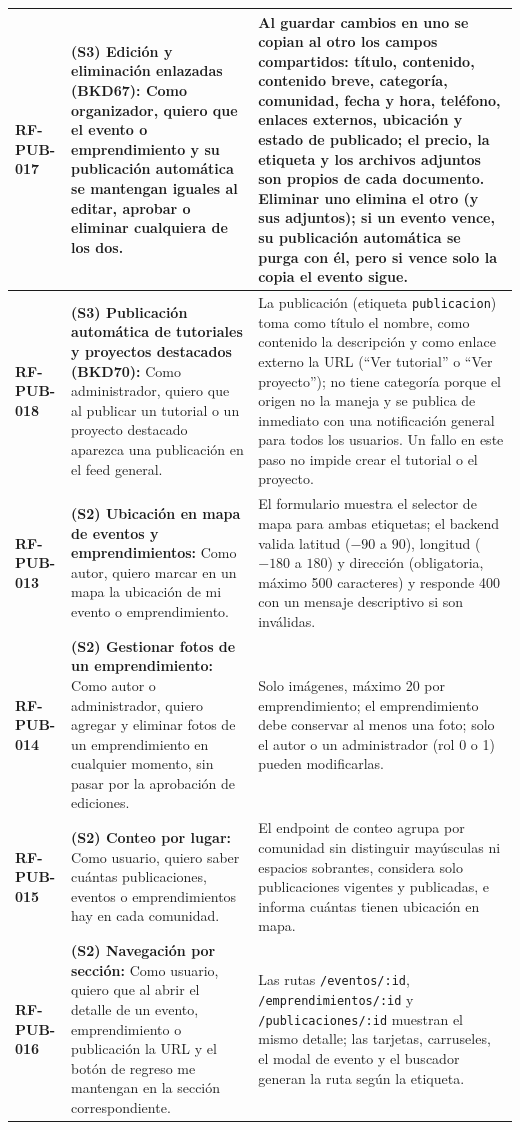\begin{longtable}{|l||p{7cm}|p{4.5cm}|}
\hline
\textbf{RF-PUB-017} & \textbf{(S3) Edición y eliminación enlazadas (BKD67):} Como organizador, quiero que el evento o emprendimiento y su publicación automática se mantengan iguales al editar, aprobar o eliminar cualquiera de los dos. & Al guardar cambios en uno se copian al otro los campos compartidos: título, contenido, contenido breve, categoría, comunidad, fecha y hora, teléfono, enlaces externos, ubicación y estado de publicado; el precio, la etiqueta y los archivos adjuntos son propios de cada documento. Eliminar uno elimina el otro (y sus adjuntos); si un evento vence, su publicación automática se purga con él, pero si vence solo la copia el evento sigue. \\
\hline
\textbf{RF-PUB-018} & \textbf{(S3) Publicación automática de tutoriales y proyectos destacados (BKD70):} Como administrador, quiero que al publicar un tutorial o un proyecto destacado aparezca una publicación en el feed general. & La publicación (etiqueta \texttt{publicacion}) toma como título el nombre, como contenido la descripción y como enlace externo la URL (``Ver tutorial'' o ``Ver proyecto''); no tiene categoría porque el origen no la maneja y se publica de inmediato con una notificación general para todos los usuarios. Un fallo en este paso no impide crear el tutorial o el proyecto. \\
\hline
\textbf{RF-PUB-013} & \textbf{(S2) Ubicación en mapa de eventos y emprendimientos:} Como autor, quiero marcar en un mapa la ubicación de mi evento o emprendimiento. & El formulario muestra el selector de mapa para ambas etiquetas; el backend valida latitud ($-90$ a $90$), longitud ($-180$ a $180$) y dirección (obligatoria, máximo 500 caracteres) y responde 400 con un mensaje descriptivo si son inválidas. \\
\hline
\textbf{RF-PUB-014} & \textbf{(S2) Gestionar fotos de un emprendimiento:} Como autor o administrador, quiero agregar y eliminar fotos de un emprendimiento en cualquier momento, sin pasar por la aprobación de ediciones. & Solo imágenes, máximo 20 por emprendimiento; el emprendimiento debe conservar al menos una foto; solo el autor o un administrador (rol 0 o 1) pueden modificarlas. \\
\hline
\textbf{RF-PUB-015} & \textbf{(S2) Conteo por lugar:} Como usuario, quiero saber cuántas publicaciones, eventos o emprendimientos hay en cada comunidad. & El endpoint de conteo agrupa por comunidad sin distinguir mayúsculas ni espacios sobrantes, considera solo publicaciones vigentes y publicadas, e informa cuántas tienen ubicación en mapa. \\
\hline
\textbf{RF-PUB-016} & \textbf{(S2) Navegación por sección:} Como usuario, quiero que al abrir el detalle de un evento, emprendimiento o publicación la URL y el botón de regreso me mantengan en la sección correspondiente. & Las rutas \texttt{/eventos/:id}, \texttt{/emprendimientos/:id} y \texttt{/publicaciones/:id} muestran el mismo detalle; las tarjetas, carruseles, el modal de evento y el buscador generan la ruta según la etiqueta. \\
\hline
\end{longtable}

